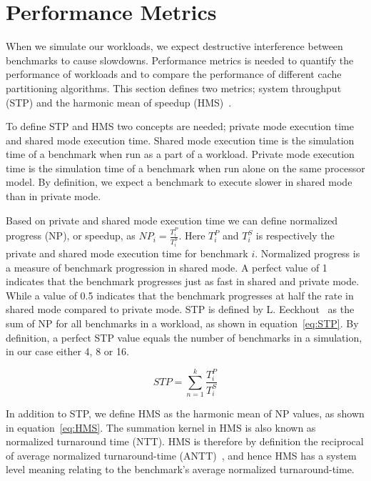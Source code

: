 \section{Performance Metrics}
\label{sec:methodology:metrics}

When we simulate our workloads, we expect destructive interference between benchmarks to cause slowdowns.
Performance metrics is needed to quantify the performance of workloads and to compare the performance of different cache partitioning algorithms.
This section defines two metrics; system throughput (STP) and the harmonic mean of speedup (HMS)~\cite{Eeckhout2010}.

To define STP and HMS two concepts are needed; private mode execution time and shared mode execution time.
Shared mode execution time is the simulation time of a benchmark when run as a part of a workload.
Private mode execution time is the simulation time of a benchmark when run alone on the same processor model.
By definition, we expect a benchmark to execute slower in shared mode than in private mode.

Based on private and shared mode execution time we can define normalized progress (NP), or speedup, as ${NP}_i = \frac{T^{P}_i}{T^{S}_i}$.
Here $T^{P}_i$ and $T^{S}_i$ is respectively the private and shared mode execution time for benchmark $i$.
Normalized progress is a measure of benchmark progression in shared mode.
A perfect value of 1 indicates that the benchmark progresses just as fast in shared and private mode.
While a value of 0.5 indicates that the benchmark progresses at half the rate in shared mode compared to private mode.
STP is defined by L. Eeckhout~\cite{Eeckhout2010} as the sum of NP for all benchmarks in a workload, as shown in equation~\ref{eq:STP}.
By definition, a perfect STP value equals the number of benchmarks in a simulation, in our case either 4, 8 or 16.

\begin{equation} \label{eq:STP} 
 {STP} = {\sum\limits_{n=1}^{k}}\frac{T^{P}_i}{T^{S}_i}
\end{equation}

In addition to STP, we define HMS as the harmonic mean of NP values, as shown in equation~\ref{eq:HMS}.
The summation kernel in HMS is also known as normalized turnaround time (NTT).
HMS is therefore by definition the reciprocal of average normalized turnaround-time (ANTT)~\cite{Eeckhout2010}, and hence HMS has a system level meaning relating to the benchmark's average normalized turnaround-time.


